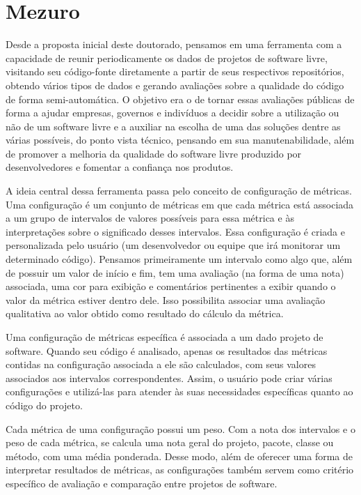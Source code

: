 \section{Mezuro}
\label{sec:mezuro}

Desde a proposta inicial deste doutorado, pensamos em uma ferramenta com a capacidade
de reunir periodicamente os dados de projetos de software livre, visitando seu
código-fonte diretamente a partir de seus respectivos repositórios, obtendo vários tipos de
dados e gerando avaliações sobre a qualidade do código de forma semi-automática.
%
O objetivo era o de tornar essas avaliações públicas de forma a ajudar empresas,
governos e indivíduos a decidir sobre a utilização ou não de um software livre
e a auxiliar na escolha de uma das soluções dentre as várias possíveis, do ponto vista
técnico, pensando em sua manutenabilidade, além de
%
promover a melhoria da qualidade do software livre
produzido por desenvolvedores e fomentar a confiança nos produtos.

A ideia central dessa ferramenta passa pelo conceito de configuração de métricas.
Uma configuração é um conjunto de métricas em que cada métrica está associada a um grupo
de intervalos de valores possíveis para essa métrica e às interpretações sobre o significado
desses intervalos.
%
Essa configuração é criada e personalizada pelo usuário (um desenvolvedor ou equipe
que irá monitorar um determinado código).
%
Pensamos primeiramente um intervalo como algo que, além de possuir um valor de
início e fim, tem uma avaliação (na forma de uma nota) associada, uma cor para exibição e
comentários pertinentes a exibir quando o valor da métrica estiver dentro dele.
%
Isso possibilita associar uma avaliação qualitativa ao valor obtido
como resultado do cálculo da métrica.

Uma configuração de métricas específica é associada a um dado projeto de software.
%
Quando seu código é analisado, apenas os resultados das métricas
contidas na configuração associada a ele são calculados, com seus valores associados
aos intervalos correspondentes.
%
Assim, o usuário pode criar várias configurações e utilizá-las para atender às suas necessidades
específicas quanto ao código do projeto.

Cada métrica de uma configuração possui um peso. Com a nota dos intervalos e o
peso de cada métrica, se calcula uma nota geral do projeto, pacote, classe ou
método, com uma média ponderada.
%
Desse modo, além de oferecer uma forma de interpretar resultados de métricas, as
configurações também servem como critério específico de avaliação e comparação
entre projetos de software.
%

